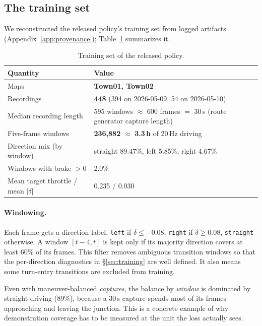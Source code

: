 \documentclass[11pt]{article}
\begin{document}
\subsection{The training set}
\label{sec:trainset}

We reconstructed the released policy's training set from logged artifacts (Appendix~\ref{app:provenance}); Table~\ref{tab:data} summarizes it.

\begin{table}[!htbp]
  \centering
  \small
  \caption{Training set of the released policy.}
  \label{tab:data}
  \begin{tabular}{@{}ll@{}}
    \toprule
    Quantity & Value \\
    \midrule
    Maps & \textbf{Town01, Town02} \\
    Recordings & \textbf{448} (394 on 2026-05-09, 54 on 2026-05-10) \\
    Median recording length & 595 windows $\approx$ 600 frames $=$ 30\,s (route generator capture length) \\
    Five-frame windows & \textbf{236,882} $\approx$ \textbf{3.3\,h} of 20\,Hz driving \\
    Direction mix (by window) & straight 89.47\%, left 5.85\%, right 4.67\% \\
    Windows with brake $> 0$ & 2.0\% \\
    Mean target throttle / mean $|\delta|$ & 0.235 / 0.030 \\
    \bottomrule
  \end{tabular}
\end{table}

\paragraph{Windowing.} Each frame gets a direction label, \texttt{left} if $\delta \le -0.08$, \texttt{right} if $\delta \ge 0.08$, \texttt{straight} otherwise. A window $[t-4, t]$ is kept only if its majority direction covers at least 60\% of its frames. This filter removes ambiguous transition windows so that the per-direction diagnostics in \S\ref{sec:training} are well defined. It also means some turn-entry transitions are excluded from training.

Even with maneuver-balanced \emph{captures}, the balance by \emph{window} is dominated by straight driving (89\%), because a 30\,s capture spends most of its frames approaching and leaving the junction. This is a concrete example of why demonstration coverage has to be measured at the unit the loss actually sees.
\end{document}
